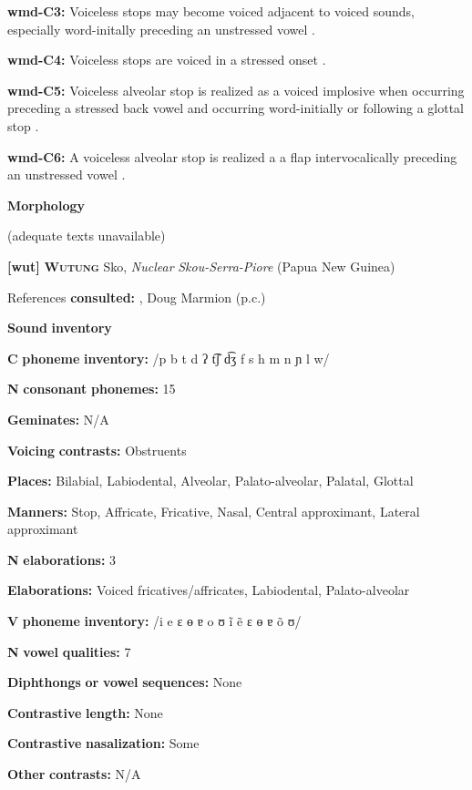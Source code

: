 \textbf{wmd-C3:} Voiceless stops may become voiced adjacent to voiced sounds, especially word-initally preceding an unstressed vowel \citep{Eberhard2009}.

\textbf{wmd-C4:} Voiceless stops are voiced in a stressed onset \citep[55]{Eberhard2009}.

\textbf{wmd-C5:} Voiceless alveolar stop is realized as a voiced implosive when occurring preceding a stressed back vowel and occurring word-initially or following a glottal stop \citep[58]{Eberhard2009}.

\textbf{wmd-C6:} A voiceless alveolar stop is realized a a flap intervocalically preceding an unstressed vowel \citep[55]{Eberhard2009}.

\textbf{Morphology}

(adequate texts unavailable)

\textbf{[wut]}   \textbf{\textsc{Wutung}}  Sko, \textit{Nuclear} \textit{Skou-Serra-Piore} (Papua New Guinea)

References \textbf{consulted:} \citet{Marmion2010}, Doug Marmion (p.c.)

\textbf{Sound} \textbf{inventory}

\textbf{C} \textbf{phoneme} \textbf{inventory:} /p b t d ʔ t͡ʃ d͡ʒ f s h m n ɲ l w/

\textbf{N} \textbf{consonant} \textbf{phonemes:} 15

\textbf{Geminates:} N/A

\textbf{Voicing} \textbf{contrasts:} Obstruents

\textbf{Places:} Bilabial, Labiodental, Alveolar, Palato-alveolar, Palatal, Glottal

\textbf{Manners:} Stop, Affricate, Fricative, Nasal, Central approximant, Lateral approximant

\textbf{N} \textbf{elaborations:} 3

\textbf{Elaborations:} Voiced fricatives/affricates, Labiodental, Palato-alveolar

\textbf{V} \textbf{phoneme} \textbf{inventory:} /i e ɛ ɵ ɐ o ʊ ĩ ẽ ɛ ɵ ɐ õ ʊ/

\textbf{N} \textbf{vowel} \textbf{qualities:} 7

\textbf{Diphthongs} \textbf{or} \textbf{vowel} \textbf{sequences:} None

\textbf{Contrastive} \textbf{length:} None

\textbf{Contrastive} \textbf{nasalization:} Some

\textbf{Other} \textbf{contrasts:} N/A

